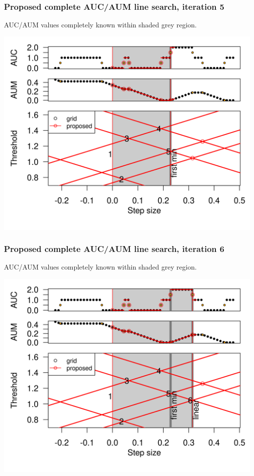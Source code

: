 \begin{frame}
  \frametitle{Proposed complete AUC/AUM line search, iteration 5}
AUC/AUM values completely known within shaded grey region.


  \includegraphics[width=\textwidth]{figure-line-search-example-5}


\end{frame}


\begin{frame}
  \frametitle{Proposed complete AUC/AUM line search, iteration 6}
AUC/AUM values completely known within shaded grey region.


  \includegraphics[width=\textwidth]{figure-line-search-example-6}


\end{frame}


